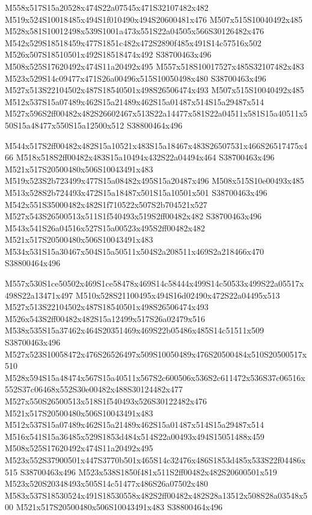 \documentclass{article}
\begin{document}
\begin{multicols}{2}
M558x517S15a20528x474S22a07545x471S32107482x482 M519x524S10018485x494S1f010490x494S20600481x476 M507x515S10040492x485 M528x581S10012498x539S1001a473x551S22a04505x566S30126482x476 M542x529S18518459x477S1851c482x472S2890f485x491S14c57516x502 M526x507S18510501x492S18518474x492 S38700463x496 M508x525S17620492x474S11a20492x495 M557x518S10017527x485S32107482x483 M523x529S14c09477x471S26a00496x515S10050498x480 S38700463x496 M527x513S22104502x487S18540501x498S26506474x493 M507x515S10040492x485 M512x537S15a07489x462S15a21489x462S15a01487x514S15a29487x514 M527x596S2ff00482x482S26602467x513S22a14477x581S22a04511x581S15a40511x550S15a48477x550S15a12500x512 S38800464x496

M544x517S2ff00482x482S15a10521x483S15a18467x483S26507531x466S26517475x466 M518x518S2ff00482x483S15a10494x432S22a04494x464 S38700463x496 M521x517S20500480x506S10043491x483 M519x523S2b723499x477S15a08482x495S15a20487x496 M508x515S10e00493x485 M513x528S2b724493x472S15a18487x501S15a10501x501 S38700463x496 M542x551S35000482x482S1f710522x507S2b704521x527 M527x543S26500513x511S1f540493x519S2ff00482x482 S38700463x496 M543x541S26a04516x527S15a00523x495S2ff00482x482 M521x517S20500480x506S10043491x483 M534x531S15a30467x504S15a50511x504S2a208511x469S2a218466x470 S38800464x496

M557x530S1ce50502x469S1ce58478x469S14c58444x499S14c50533x499S22a05517x498S22a13471x497 M510x528S21100495x494S16d02490x472S22a04495x513 M527x513S22104502x487S18540501x498S26506474x493 M526x543S2ff00482x482S15a12499x517S26a02479x516 M538x535S15a37462x464S20351469x469S22b05486x485S14c51511x509 S38700463x496 M527x523S10058472x476S26526497x509S10050489x476S20500484x510S20500517x510 M528x594S15a48474x567S15a40511x567S2c600506x536S2c611472x536S37c06516x552S37c06468x552S30e00482x488S30124482x477 M527x550S26500513x518S1f540493x526S30122482x476 M521x517S20500480x506S10043491x483 M512x537S15a07489x462S15a21489x462S15a01487x514S15a29487x514 M516x541S15a36485x529S1853d484x514S22a00493x494S15051488x459 M508x525S17620492x474S11a20492x495 M523x552S37900501x447S3770b501x465S14c32476x486S1853d485x533S22f04486x515 S38700463x496 M523x538S1850f481x511S2ff00482x482S20600501x519 M523x520S20348493x505S14c51477x486S26a07502x480 M583x537S18530524x491S18530558x482S2ff00482x482S28a13512x508S28a03548x500 M521x517S20500480x506S10043491x483 S38800464x496


\end{multicols}
\end{document}
